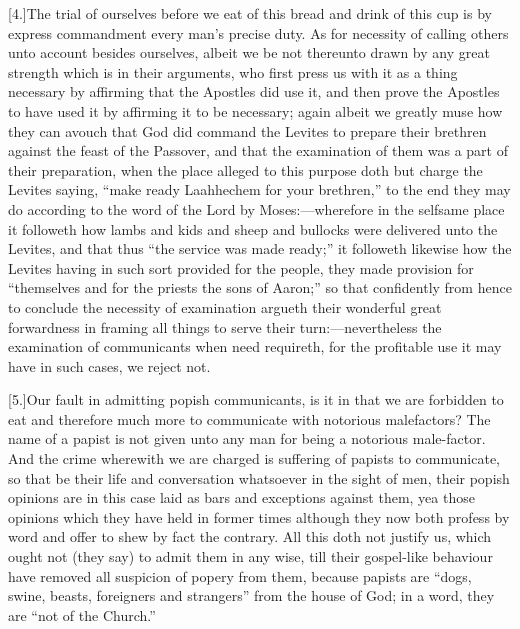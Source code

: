 [4.]The trial of ourselves before we eat of this bread and drink of this cup is by express commandment every man’s precise duty. As for necessity of calling others unto account besides ourselves, albeit we be not thereunto drawn by any great strength which is in their arguments, who first press us with it as a thing necessary by affirming that the Apostles did use it, and then prove the Apostles to have used it by affirming it to be necessary; again albeit we greatly muse  how they can avouch that God did command the Levites to prepare their brethren against the feast of the Passover,
 and that the examination of them was a part of their preparation, when the place alleged to this purpose doth but charge the Levites saying, “make ready Laahhechem for your brethren,” to the end they may do according to the word of the Lord by Moses:—wherefore in the selfsame place it followeth how lambs and kids and sheep and bullocks were delivered unto the Levites, and that thus “the service was made ready;” it followeth likewise how the Levites having in such sort provided for the people, they made provision for “themselves and for the priests the sons of Aaron;” so that confidently from hence to conclude the necessity of examination argueth their wonderful great forwardness in framing all things to serve their turn:—nevertheless the examination of communicants when need requireth, for the profitable use it may have in such cases, we reject not.

[5.]Our fault in admitting popish communicants, is it in that we are forbidden to eat and therefore much more to communicate with notorious malefactors? The name of a papist is not given unto any man for being a notorious male-factor. And the crime wherewith we are charged is suffering of papists to communicate, so that be their life and conversation whatsoever in the sight of men, their popish opinions are in this case laid as bars and exceptions against them, yea those opinions which they have held in former times although they now both profess by word and offer to shew by fact the contrary. All this doth not justify us, which ought not (they  say) to admit them in any wise, till their gospel-like behaviour have removed all suspicion of popery from them, because papists are “dogs, swine,
 beasts, foreigners and strangers” from the house of God; in a word, they are “not of the Church.”

